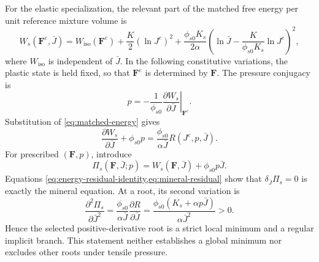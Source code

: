 \documentclass[11pt]{article}
\newcommand{\mbf}[1]{\mathbf{#1}}
\newcommand{\pder}[2]{\frac{\partial #1}{\partial #2}}
\begin{document}
For the elastic specialization, the relevant part of the matched free energy
per unit reference mixture volume is
\begin{equation}
 W_s(\mbf F^e,\bar J)
 =W_{\mathrm{iso}}(\mbf F^e)
 +\frac K2(\ln J^e)^2
 +\frac{\phi_{s0}K_s}{2\alpha}
 \left(\ln\bar J-\frac{K}{\phi_{s0}K_s}\ln J^e\right)^2,
 \label{eq:matched-energy}
\end{equation}
where \(W_{\mathrm{iso}}\) is independent of \(\bar J\).  In the
following constitutive variations, the plastic state is held fixed, so that
\(\mbf F^e\) is determined by \(\mbf F\).  The pressure conjugacy is
\begin{equation}
 p=-\frac{1}{\phi_{s0}}
 \left.\pder{W_s}{\bar J}\right|_{\mbf F^e}.
 \label{eq:pressure-conjugacy}
\end{equation}
Substitution of \cref{eq:matched-energy} gives
\begin{equation}
 \pder{W_s}{\bar J}+\phi_{s0}p
 =\frac{\phi_{s0}}{\alpha\bar J}R(J^e,p,\bar J).
 \label{eq:energy-residual-identity}
\end{equation}
For prescribed \((\mbf F,p)\), introduce
\begin{equation}
 \Pi_s(\mbf F,\bar J;p)=W_s(\mbf F,\bar J)+\phi_{s0}p\bar J.
 \label{eq:local-mineral-potential}
\end{equation}
Equations \cref{eq:energy-residual-identity,eq:mineral-residual} show that
\(\delta_{\bar J}\Pi_s=0\) is exactly the mineral equation.  At a root,
its second variation is
\begin{equation}
 \frac{\partial^2\Pi_s}{\partial\bar J^2}
 =\frac{\phi_{s0}}{\alpha\bar J}
 \pder{R}{\bar J}
 =\frac{\phi_{s0}\left(K_s+\alpha p\bar J\right)}
 {\alpha\bar J^2}>0.
 \label{eq:mineral-curvature}
\end{equation}
Hence the selected positive-derivative root is a strict local minimum and a
regular implicit branch.  This statement neither establishes a global minimum
nor excludes other roots under tensile pressure.
\end{document}

